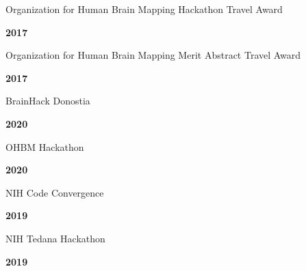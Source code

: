 \documentclass[10pt]{article}
\newcommand{\sectionstyle}{\LARGE \fontfamily{lmr}\selectfont}
\begin{document}
\begin{minipage}[t]{.85\linewidth}
\flushleft
\noindent
Organization for Human Brain Mapping Hackathon Travel Award
\end{minipage}
\hfill
\begin{minipage}[t]{.15\linewidth}
\flushright
\noindent
\textsc{\textbf{2017}}
\end{minipage}

\begin{minipage}[t]{.85\linewidth}
\flushleft
\noindent
Organization for Human Brain Mapping Merit Abstract Travel Award
\end{minipage}
\hfill
\begin{minipage}[t]{.15\linewidth}
\flushright
\noindent
\textsc{\textbf{2017}}
\end{minipage}

\bigskip

\begin{center}\sectionstyle{HACKATHONS}\end{center}

\begin{minipage}[t]{.85\linewidth}
\flushleft
\noindent
BrainHack Donostia
\end{minipage}
\hfill
\begin{minipage}[t]{.15\linewidth}
\flushright
\noindent
\textsc{\textbf{2020}}
\end{minipage}

\begin{minipage}[t]{.85\linewidth}
\flushleft
\noindent
OHBM Hackathon
\end{minipage}
\hfill
\begin{minipage}[t]{.15\linewidth}
\flushright
\noindent
\textsc{\textbf{2020}}
\end{minipage}

\begin{minipage}[t]{.85\linewidth}
\flushleft
\noindent
NIH Code Convergence
\end{minipage}
\hfill
\begin{minipage}[t]{.15\linewidth}
\flushright
\noindent
\textsc{\textbf{2019}}
\end{minipage}

\begin{minipage}[t]{.85\linewidth}
\flushleft
\noindent
NIH Tedana Hackathon
\end{minipage}
\hfill
\begin{minipage}[t]{.15\linewidth}
\flushright
\noindent
\textsc{\textbf{2019}}
\end{minipage}
\end{document}
